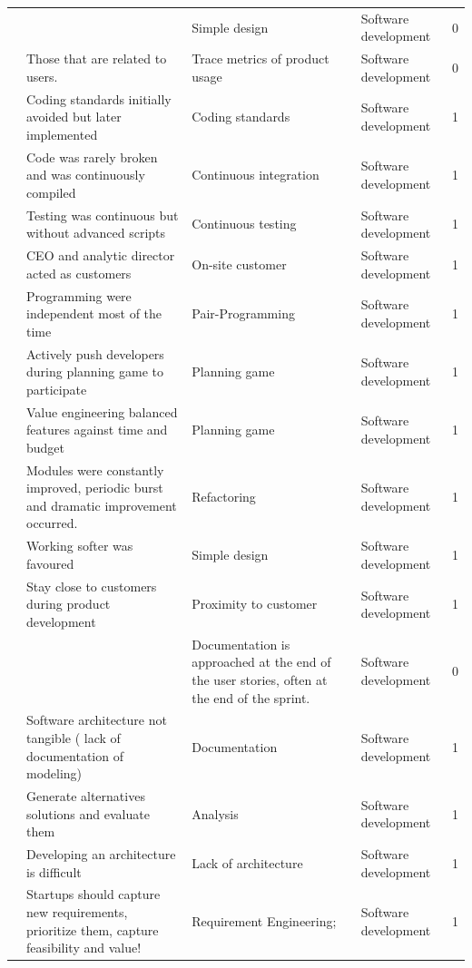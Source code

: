 \documentclass[final,5p,times,twocolumn]{elsarticle}
\begin{document}
\begin{center}
\begin{longtable}{|p{0.4in}|p{3in}|p{1.3in}|p{1in}|p{0.3in}|}
\cite{Taipale2010} &       & Simple design & Software development & 0 \\
\cite{Taipale2010} & Those that are related to users. & Trace metrics of product usage & Software development & 0 \\
\cite{Tingling2007} & Coding standards initially avoided  but later implemented & Coding standards & Software development & 1 \\
\cite{Tingling2007} & Code was rarely broken and was continuously compiled & Continuous integration & Software development & 1 \\
\cite{Tingling2007} & Testing was continuous but without advanced scripts & Continuous testing & Software development & 1 \\
\cite{Tingling2007} & CEO and analytic director acted as customers & On-site customer & Software development & 1 \\
\cite{Tingling2007} & Programming were independent most of the time & Pair-Programming & Software development & 1 \\
\cite{Deias} & Actively push developers during planning game to participate & Planning game & Software development & 1 \\
\cite{Tingling2007} & Value engineering balanced features against time and budget & Planning game & Software development & 1 \\
\cite{Tingling2007} & Modules were constantly improved, periodic burst and dramatic improvement occurred. & Refactoring & Software development & 1 \\
\cite{Tingling2007} & Working softer was favoured & Simple design & Software development & 1 \\
\cite{Crowne2002} & Stay close to customers during product development & Proximity to customer & Software development & 1 \\
\cite{Kuvinka2011} &       & Documentation is approached at the end of the user stories, often at the end of the sprint. & Software development & 0 \\
\cite{Camel1994a} & Software architecture not tangible ( lack of documentation of modeling) & Documentation & Software development & 1 \\
\cite{Deakins2005} & Generate alternatives solutions and evaluate them & Analysis & Software development & 1 \\
\cite{Deias} & Developing an architecture is difficult & Lack of architecture & Software development & 1 \\
\cite{Crowne2002} & Startups should capture new requirements, prioritize them, capture feasibility and value! & Requirement Engineering; & Software development & 1 \\

\end{longtable}
\end{center}
\end{document}
